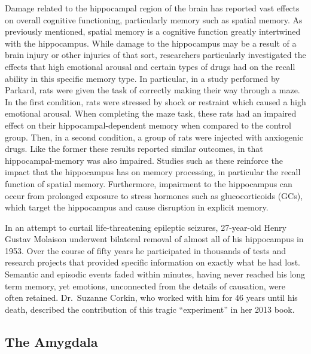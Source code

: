 Damage related to the hippocampal region of the brain has reported vast effects on overall cognitive functioning, particularly memory such as spatial memory. As previously mentioned, spatial memory is a cognitive function greatly intertwined with the hippocampus. While damage to the hippocampus may be a result of a brain injury or other injuries of that sort, researchers particularly investigated the effects that high emotional arousal and certain types of drugs had on the recall ability in this specific memory type. In particular, in a study performed by Parkard, rats were given the task of correctly making their way through a maze. In the first condition, rats were stressed by shock or restraint which caused a high emotional arousal. When completing the maze task, these rats had an impaired effect on their hippocampal-dependent memory when compared to the control group. Then, in a second condition, a group of rats were injected with anxiogenic drugs. Like the former these results reported similar outcomes, in that hippocampal-memory was also impaired. Studies such as these reinforce the impact that the hippocampus has on memory processing, in particular the recall function of spatial memory. Furthermore, impairment to the hippocampus can occur from prolonged exposure to stress hormones such as glucocorticoids (GCs), which target the hippocampus and cause disruption in explicit memory.

In an attempt to curtail life-threatening epileptic seizures, 27-year-old Henry Gustav Molaison underwent bilateral removal of almost all of his hippocampus in 1953. Over the course of fifty years he participated in thousands of tests and research projects that provided specific information on exactly what he had lost. Semantic and episodic events faded within minutes, having never reached his long term memory, yet emotions, unconnected from the details of causation, were often retained. Dr.~Suzanne Corkin, who worked with him for 46 years until his death, described the contribution of this tragic ``experiment'' in her 2013 book.

\hypertarget{the-amygdala}{%
\subsection{The Amygdala}\label{the-amygdala}}


